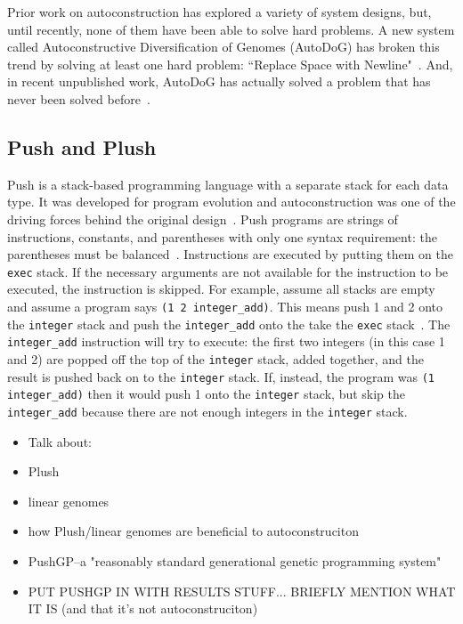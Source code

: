 \documentclass{sig-alternate}
\begin{document}
Prior work on autoconstruction has explored a variety of system designs, but, until recently, none of them have been able to solve hard problems. A new system called Autoconstructive Diversification of Genomes (AutoDoG) has broken this trend by solving at least one hard problem: ``Replace Space with Newline"~\cite{spector:2016}. And, in recent unpublished work, AutoDoG has actually solved a problem that has never been solved before~\cite{eva:2017}.

\subsection{Push and Plush}
\label{sec:push}

Push is a stack-based programming language with a separate stack for each data type. It was developed for program evolution and autoconstruction was one of the driving forces behind the original design~\cite{spector:2016}. Push programs are strings of instructions, constants, and parentheses with only one syntax requirement: the parentheses must be balanced~\cite{lee:2001}.
Instructions are executed by putting them on the \texttt{exec} stack. If the necessary arguments are not available for the instruction to be executed, the instruction is skipped. For example, assume all stacks are empty and assume a program says \texttt{(1 2 integer\_add)}. This means push 1 and 2 onto the \texttt{integer} stack and push the \texttt{integer\_add} onto the  take the \texttt{exec} stack~\cite{lee:tutorial}. The \texttt{integer\_add} instruction will try to execute: the first two integers (in this case 1 and 2)  are popped off the top of the \texttt{integer} stack, added together, and the result is pushed back on to the \texttt{integer} stack. If, instead, the program was \texttt{(1 integer\_add)} then it would push 1 onto the \texttt{integer} stack, but skip the \texttt{integer\_add} because there are not enough integers in the \texttt{integer} stack.

\begin{itemize}
	\item Talk about:
	\item Plush
	\item linear genomes
	\item how Plush/linear genomes are beneficial to autoconstruciton
	\item PushGP--a "reasonably standard generational genetic programming system"
	\item PUT PUSHGP IN WITH RESULTS STUFF... BRIEFLY MENTION WHAT IT IS (and that it's not autoconstruciton)
\end{itemize}
\end{document}
